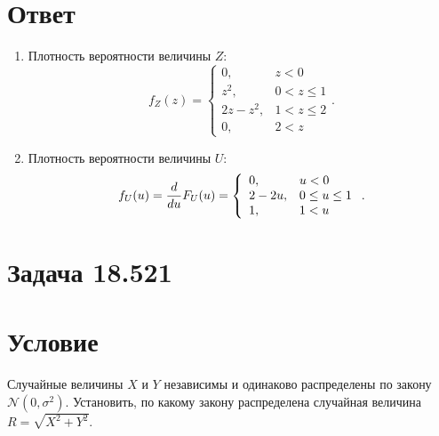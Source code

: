 \section*{Ответ}
\begin{enumerate}
    \item Плотность вероятности величины $Z$:
    $$
    f_Z(z)
    = \left \{
    \begin{array}{ll}
        0,        & z < 0       \\
        z^2,      & 0 < z \le 1 \\
        2z - z^2, & 1 < z \le 2 \\
        0,        & 2 < z
    \end{array}
    \right .
    .
    $$

    \item Плотность вероятности величины $U$:
    $$
    f_U(u)
    = \frac{d}{du} F_U(u)
    = \left \{
    \begin{array}{ll}
        0,      & u < 0         \\
        2 - 2u, & 0 \le u \le 1 \\
        1,      & 1 < u
    \end{array}
    \right .
    .
    $$
\end{enumerate}


\section{Задача 18.521}
\section*{Условие}
Случайные величины $X$ и $Y$ независимы и одинаково распределены по закону $\mathcal{N}(0, \sigma^2)$. Установить, по какому закону распределена случайная величина
$R = \sqrt{X^2 + Y^2}$.
